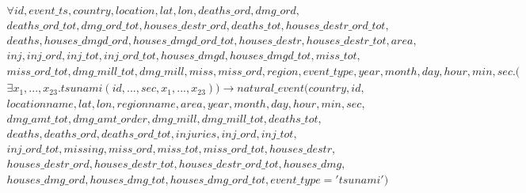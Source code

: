 \documentclass{article}
\begin{document}
\begin{multline}
\forall id,  event\_ts,  country,  location,  lat,  lon,  deaths\_ord,  dmg\_ord,  \\ deaths\_ord\_tot,  dmg\_ord\_tot,  houses\_destr\_ord,  deaths\_tot,  houses\_destr\_ord\_tot, \\ deaths,  houses\_dmgd\_ord,  houses\_dmgd\_ord\_tot,  houses\_destr,  houses\_destr\_tot,  area, \\ inj,  inj\_ord,  inj\_tot,  inj\_ord\_tot,  houses\_dmgd,  houses\_dmgd\_tot,  miss\_tot, \\ miss\_ord\_tot,  dmg\_mill\_tot,  dmg\_mill,  miss,  miss\_ord,  region,  event\_type,  year,  month,  day,  hour,  min,  sec.( \\
\exists x_1, ..., x_{23}. tsunami(id, ..., sec, x_1, ..., x_{23})) \longrightarrow natural\_event(country, id, \\ locationname, lat, lon,  regionname, area, year, month, day, hour, min, sec, \\ dmg\_amt\_tot, dmg\_amt\_order, dmg\_mill, dmg\_mill\_tot, deaths\_tot, \\ deaths, deaths\_ord, deaths\_ord\_tot, injuries, inj\_ord, inj\_tot, \\ inj\_ord\_tot, missing, miss\_ord, miss\_tot, miss\_ord\_tot, houses\_destr, \\ houses\_destr\_ord, houses\_destr\_tot, houses\_destr\_ord\_tot, houses\_dmg, \\ houses\_dmg\_ord, houses\_dmg\_tot, houses\_dmg\_ord\_tot, event\_type =  'tsunami')
\end{multline} 
\end{document}
